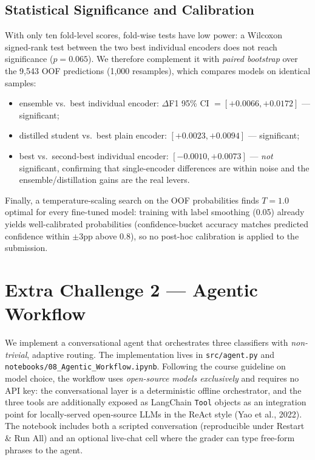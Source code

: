 \documentclass[11pt,a4paper]{article}
\begin{document}
\subsection{Statistical Significance and Calibration}
With only ten fold-level scores, fold-wise tests have low power: a Wilcoxon signed-rank test
between the two best individual encoders does not reach significance ($p=0.065$). We therefore
complement it with \emph{paired bootstrap} over the 9{,}543 OOF predictions (1{,}000 resamples),
which compares models on identical samples:
\begin{itemize}
  \item ensemble vs.\ best individual encoder: $\Delta$F1 95\% CI $=[+0.0066, +0.0172]$ --- significant;
  \item distilled student vs.\ best plain encoder: $[+0.0023, +0.0094]$ --- significant;
  \item best vs.\ second-best individual encoder: $[-0.0010, +0.0073]$ --- \emph{not} significant,
  confirming that single-encoder differences are within noise and the ensemble/distillation gains
  are the real levers.
\end{itemize}
Finally, a temperature-scaling search on the OOF probabilities finds $T{=}1.0$ optimal for every
fine-tuned model: training with label smoothing (0.05) already yields well-calibrated
probabilities (confidence-bucket accuracy matches predicted confidence within $\pm$3pp above 0.8),
so no post-hoc calibration is applied to the submission.

\section{Extra Challenge 2 --- Agentic Workflow}
We implement a conversational agent that orchestrates three classifiers with \emph{non-trivial},
adaptive routing. The implementation lives in \nolinkurl{src/agent.py} and
\nolinkurl{notebooks/08_Agentic_Workflow.ipynb}. Following the course guideline on model choice,
the workflow uses \emph{open-source models exclusively} and requires no API key: the
conversational layer is a deterministic offline orchestrator, and the three tools are additionally
exposed as LangChain \texttt{Tool} objects as an integration point for locally-served open-source
LLMs in the ReAct style (Yao et al., 2022). The notebook includes both a scripted conversation
(reproducible under Restart \& Run All) and an optional live-chat cell where the grader can type
free-form phrases to the agent.
\end{document}
